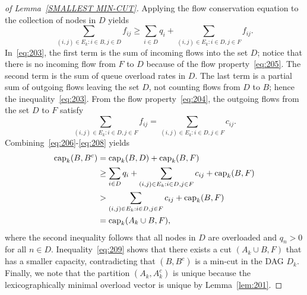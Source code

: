 \documentclass{sig-alternate-2013}
\newcommand{\capp}{\operatorname{cap}}
\begin{document}
\begin{proof}[of Lemma~\ref{SMALLEST MIN-CUT}]
Applying the flow conservation equation to the collection of nodes in $D$ yields
\begin{equation} \label{eq:203}
\sum_{(i, j)\in E_{k}: i\in B, j\in D} f_{ij} \geq \sum_{i\in D} q_{i} + \sum_{(i, j)\in E_{k}: i\in D, j\in F} f_{ij}.
\end{equation}
In~\eqref{eq:203}, the first term is the sum of incoming flows into the set $D$; notice that there is no incoming flow from $F$ to $D$ because of the flow property~\eqref{eq:205}. The second term is the sum of queue overload rates in $D$. The last term is a partial sum of outgoing flows leaving the set $D$, not counting flows from $D$ to $B$; hence the inequality~\eqref{eq:203}. From the flow property~\eqref{eq:204}, the outgoing flows from the set $D$ to $F$ satisfy
\begin{equation} \label{eq:208}
\sum_{(i, j)\in E_{k}: i\in D, j\in F} f_{ij} = \sum_{(i, j)\in E_{k}: i\in D, j\in F} c_{ij}.
\end{equation}
Combining~\eqref{eq:206}-\eqref{eq:208} yields
\begin{align}
\capp_k(B, B^c) &= \capp_k(B, D) + \capp_k(B, F) \notag \\
&\geq \sum_{i\in D} q_{i} + \sum_{(i, j)\in E_{k}: i\in D, j\in F} c_{ij} + \capp_k(B, F) \notag \\
&> \sum_{(i, j)\in E_{k}: i\in D, j\in F} c_{ij} + \capp_k(B, F) \notag \\
&= \capp_k(A_{k}\cup B, F), \label{eq:209}
\end{align}
where the second inequality follows that all nodes in $D$ are overloaded and $q_{n}>0$ for all $n\in D$. Inequality~\eqref{eq:209} shows that there exists a cut $(A_k\cup B, F)$ that has a smaller capacity, contradicting that $(B, B^{c})$ is a min-cut in the DAG $D_{k}$. Finally, we note that the 
partition
 $(A_k,A^c_k)$ is unique because the lexicographically minimal overload vector is unique by Lemma~\ref{lem:201}.
\end{proof}
\end{document}
